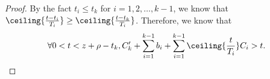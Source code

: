 \begin{proof}
By the fact $t_i \leq t_k$ for $i=1,2,\ldots,k-1$, we know that $\ceiling{\frac{t- t_i}{T_i} } \geq \ceiling{\frac{t- t_k}{T_i} }$. Therefore, we know that 
\[
\forall 0 < t < z+\rho-t_k, C_k'+\sum_{i=1}^{k-1} b_i + \sum_{i=1}^{k-1} \ceiling{\frac{t}{T_i} } C_i > t.
\]

\end{proof}
  
  

  
  
  
  
  
  
  
  
  
  
  
  
  
  
  
  
  
  
  
  
  
  
  
  
  
  
  
  
  
  
  
  
  